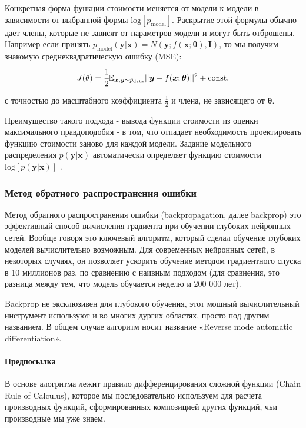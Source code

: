 Конкретная форма функции стоимости меняется от модели к модели в зависимости от выбранной 
формы $\text{log} \left[ p_\text{model} \right]$. Раскрытие этой формулы обычно дает члены, которые не
зависят от параметров модели и могут быть отброшены. Например если принять 
$p_\text{model}(\bm{y} | \bm{x}) = N(\bm{y}; f(\bm{x}; \bm{\theta}), \bm{I})$, то 
мы получим знакомую среднеквадратическую ошибку (MSE):
\begin{equation*}
    J(\theta) = \cfrac{1}{2} \mathbb{E}_{\bm{x},\bm{y} \sim \hat{p}_{\text{data}}} || \bm{y} - f(\bm{x}; \bm{\theta}) ||^2 + \text{const}.
\end{equation*}

с точностью до масштабного коэффициента $\frac{1}{2}$ и члена, не зависящего от 
$\bm{\theta}$. 

Преимущество такого подхода - вывода функции стоимости из оценки максимального 
правдоподобия - в том, что отпадает необходимость проектировать функцию 
стоимости заново для каждой модели. Задание модельного распределения $p(\bm{y} | \bm{x})$ 
автоматически определяет функцию стоимости $\text{log} \left[ p(\bm{y} | \bm{x}) \right]$ 
\cite{Goodfellow-et-al-2016}.

\subsubsection{Метод обратного распространения ошибки}

Метод обратного распространения ошибки (backpropagation, далее backprop) это 
эффективный способ вычисления градиента при обучении глубоких нейронных сетей. 
Вообще говоря это ключевый алгоритм, который сделал обучение глубоких моделей 
вычислительно возможным. Для современных нейронных сетей, в некоторых случаях, 
он позволяет ускорить обучение методом градиентного спуска в 10 миллионов раз, по 
сравнению с наивным подходом (для сравнения, это разница между тем, что модель 
обучается неделю и 200 000 лет). 

Backprop не эксклюзивен для глубокого обучения, этот мощный вычислительный 
инструмент используют и во многих дургих областях, просто под другим названием. 
В общем случае алгоритм носит название «Reverse mode automatic differentiation».

\paragraph{Предпосылка}

В основе алогритма лежит правило дифференцирования сложной функции 
(Chain Rule of Calculus), которое мы последовательно используем для 
расчета производных функций, сформированных композицией других функций, чьи 
производные мы уже знаем.

